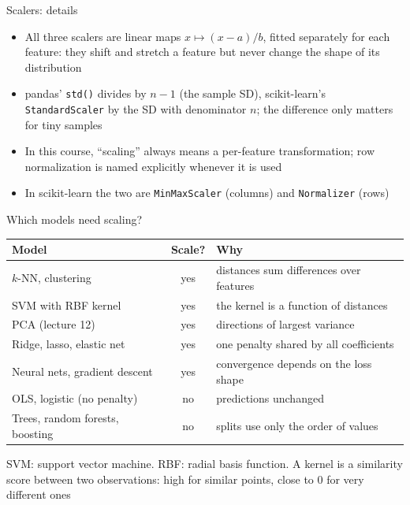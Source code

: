 \begin{frame}{Scalers: details}
    \begin{itemize}
        \item All three scalers are linear maps $x \mapsto (x - a)/b$, fitted separately for each feature: they shift and stretch a feature but never change the shape of its distribution
        \item pandas' \texttt{std()} divides by $n - 1$ (the sample SD), scikit-learn's \texttt{StandardScaler} by the SD with denominator $n$; the difference only matters for tiny samples
        \item In this course, ``scaling'' always means a per-feature transformation; row normalization is named explicitly whenever it is used
        \item In scikit-learn the two are \texttt{MinMaxScaler} (columns) and \texttt{Normalizer} (rows)
    \end{itemize}
\end{frame}

\begin{frame}{Which models need scaling?}
    \centering
    \footnotesize
    \begin{tabular}{@{}l c l@{}}
        \toprule
        Model & Scale? & Why \\
        \midrule
        $k$-NN, clustering & yes & distances sum differences over features \\
        SVM with RBF kernel & yes & the kernel is a function of distances \\
        PCA (lecture 12) & yes & directions of largest variance \\
        Ridge, lasso, elastic net & yes & one penalty shared by all coefficients \\
        Neural nets, gradient descent & yes & convergence depends on the loss shape \\
        OLS, logistic (no penalty) & no & predictions unchanged \\
        Trees, random forests, boosting & no & splits use only the order of values \\
        \bottomrule
    \end{tabular}

    \medskip
    {\scriptsize SVM: support vector machine. RBF: radial basis function. A kernel is a similarity score between two observations: high for similar points, close to 0 for very different ones}
\end{frame}

